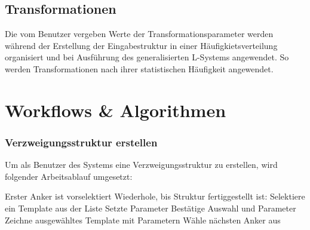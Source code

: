 \subsection*{Transformationen}
Die vom Benutzer vergeben Werte der Transformationsparameter werden während der Erstellung der Eingabestruktur in
einer Häufigkietsverteilung organisiert und bei Ausführung des generalisierten L-Systems angewendet.
So werden Transformationen nach ihrer statistischen Häufigkeit angewendet.

\section{Workflows \& Algorithmen}
\label{algo}

\subsubsection*{Verzweigungsstruktur erstellen}
Um als Benutzer des Systems eine Verzweigungsstruktur zu erstellen, wird folgender Arbeitsablauf umgesetzt:
\begin{algorithm}[caption={Erstellen einer Verzweigungsstruktur}, label={alg1}]
    Erster Anker ist vorselektiert
    Wiederhole, bis Struktur fertiggestellt ist:
    Selektiere ein Template aus der Liste
    Setzte Parameter
    Bestätige Auswahl und Parameter
    Zeichne ausgewähltes Template mit Parametern
    Wähle nächsten Anker aus
\end{algorithm}

